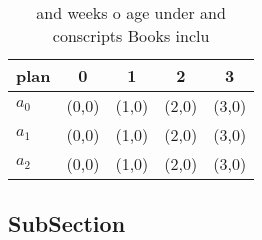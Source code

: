 \documentclass[a4paper]{article}
\begin{document}
\begin{table}
\begin{adjustbox}{width=0.6\columnwidth}
\begin{tabular}{|l|l|l|l|l|}
\hline
\textbf{plan} & \multicolumn{1}{c|}{\textbf{0}} & \multicolumn{1}{c|}{\textbf{1}} & \multicolumn{1}{c|}{\textbf{2}} & \multicolumn{1}{c|}{\textbf{3}} \\ \hline
\textbf{$a_0$}  & (0,0) & (1,0) & (2,0) & (3,0) \\ \hline
\textbf{$a_1$}  & (0,0) & (1,0) & (2,0) & (3,0) \\ \hline
\textbf{$a_2$}  & (0,0) & (1,0) & (2,0) & (3,0) \\ \hline
\end{tabular}
\end{adjustbox}
\caption{ and weeks o age under and conscripts Books inclu
}
\end{table}

\subsection{SubSection}
\end{document}
